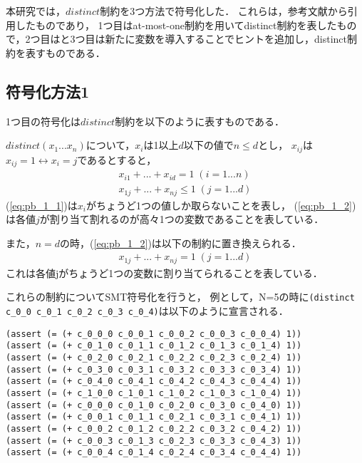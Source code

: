 

% 

本研究では，$distinct$制約を3つ方法で符号化した．
これらは，参考文献\cite{Ono19:ai}から引用したものであり，
1つ目はat-most-one制約を用いてdistinct制約を表したもので，2つ目はと3つ目は新たに変数を導入することでヒントを追加し，distinct制約を表すものである．


\subsection{符号化方法1}\label{sec:pb_1}
1つ目の符号化は$distinct$制約を以下のように表すものである．

$distinct(x_1 ... x_n)$について，$x_i$は1以上$d$以下の値で$n \leq d$とし，
$x_{ij}$は$x_{ij} = 1 \leftrightarrow x_i = j$であるとすると，
\begin{eqnarray}
    x_{i1} + ... + x_{id}=1 \; (i=1 ... n) \label{eq:pb_1_1}\\
    x_{1j} + ... + x_{nj}\leq1 \; (j=1 ... d) \label{eq:pb_1_2}
\end{eqnarray}
(\ref{eq:pb_1_1})は$x_i$がちょうど1つの値しか取らないことを表し，
(\ref{eq:pb_1_2})は各値$j$が割り当て割れるのが高々1つの変数であることを表している．

また，$n=d$の時，(\ref{eq:pb_1_2})は以下の制約に置き換えられる．
\begin{eqnarray}
    x_{1j} + ... + x_{nj}=1 \; (j=1 ... d) \label{eq:pb_1_3}
\end{eqnarray}
これは各値jがちょうど1つの変数に割り当てられることを表している．

これらの制約についてSMT符号化を行うと，
例として，N=5の時に\verb|(distinct c_0_0 c_0_1 c_0_2 c_0_3 c_0_4)|は以下のように宣言される．

\begin{verbatim}
(assert (= (+ c_0_0_0 c_0_0_1 c_0_0_2 c_0_0_3 c_0_0_4) 1))
(assert (= (+ c_0_1_0 c_0_1_1 c_0_1_2 c_0_1_3 c_0_1_4) 1))
(assert (= (+ c_0_2_0 c_0_2_1 c_0_2_2 c_0_2_3 c_0_2_4) 1))
(assert (= (+ c_0_3_0 c_0_3_1 c_0_3_2 c_0_3_3 c_0_3_4) 1))
(assert (= (+ c_0_4_0 c_0_4_1 c_0_4_2 c_0_4_3 c_0_4_4) 1))
(assert (= (+ c_1_0_0 c_1_0_1 c_1_0_2 c_1_0_3 c_1_0_4) 1))
(assert (= (+ c_0_0_0 c_0_1_0 c_0_2_0 c_0_3_0 c_0_4_0) 1))
(assert (= (+ c_0_0_1 c_0_1_1 c_0_2_1 c_0_3_1 c_0_4_1) 1))
(assert (= (+ c_0_0_2 c_0_1_2 c_0_2_2 c_0_3_2 c_0_4_2) 1))
(assert (= (+ c_0_0_3 c_0_1_3 c_0_2_3 c_0_3_3 c_0_4_3) 1))
(assert (= (+ c_0_0_4 c_0_1_4 c_0_2_4 c_0_3_4 c_0_4_4) 1))
\end{verbatim}


